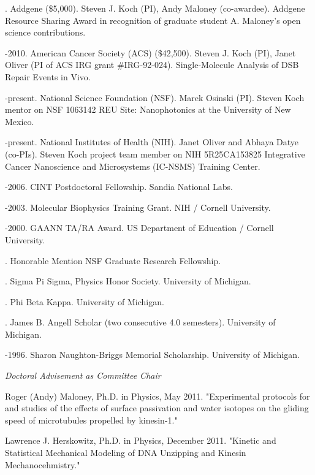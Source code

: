 \documentclass[11pt]{article}
\begin{document}
. Addgene (\$5,000). Steven J. Koch (PI), Andy Maloney (co-awardee). Addgene Resource Sharing Award in recognition of graduate student A. Maloney's open science contributions.

-2010. American Cancer Society (\textsc{ACS}) (\$42,500).  Steven J. Koch (PI), Janet Oliver (PI of ACS IRG grant \#IRG-92-024). Single-Molecule Analysis of DSB Repair Events in Vivo.

-present. National Science Foundation (\textsc{NSF}). Marek Osinski (PI). Steven Koch mentor on NSF 1063142 REU Site: Nanophotonics at the University of New Mexico.

-present. National Institutes of Health (\textsc{NIH}). Janet Oliver and Abhaya Datye (co-PIs). Steven Koch project team member on NIH 5R25CA153825 Integrative Cancer Nanoscience and Microsystems (IC-NSMS) Training Center.

-2006. CINT Postdoctoral Fellowship.  Sandia National Labs.

-2003. Molecular Biophysics Training Grant. NIH / Cornell University.

-2000. GAANN TA/RA Award.  US Department of Education / Cornell University.

. Honorable Mention NSF Graduate Research Fellowship.

. Sigma Pi Sigma, Physics Honor Society. University of Michigan.

. Phi Beta Kappa. University of Michigan.

. James B. Angell Scholar (two consecutive 4.0 semesters). University of Michigan.

-1996. Sharon Naughton-Briggs Memorial Scholarship.  University of Michigan.

\bigskip 

\newpage

\medskip
{}

\noindent\emph{Doctoral Advisement as Committee Chair \vspace{0.01in}}

\ind Roger (Andy) Maloney, Ph.D. in Physics, May 2011. "Experimental protocols for and studies of the effects of surface passivation and water isotopes on the gliding speed of microtubules propelled by kinesin-1."

\ind Lawrence J. Herskowitz, Ph.D. in Physics, December 2011. "Kinetic and Statistical Mechanical Modeling of DNA Unzipping and Kinesin Mechanocehmistry."
\end{document}
